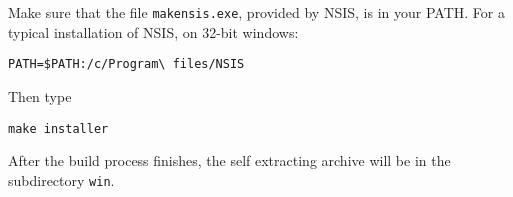 \documentclass[11pt, a4paper, titlepage]{article}
\begin{document}
Make sure that the file \verb+makensis.exe+, provided by
NSIS, is in your PATH. For a typical installation of NSIS, on 32-bit
windows:
\begin{verbatim}
PATH=$PATH:/c/Program\ files/NSIS
\end{verbatim}
Then type
\begin{verbatim}
make installer
\end{verbatim}
After the build process finishes, the self extracting archive will be
in the subdirectory \verb+win+.
\end{document}

